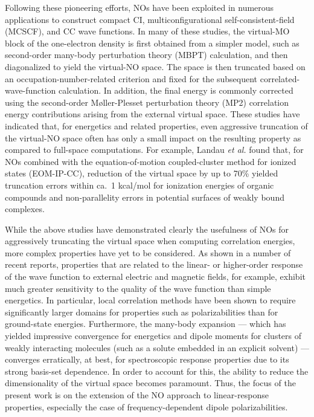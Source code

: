 Following these pioneering efforts, NOs have been exploited in numerous
applications to construct compact CI,\cite{Fermann94,Sherrill98:CI,Abrams04}
multiconfigurational self-consistent-field (MCSCF),\cite{Jensen88} and CC wave
functions.\cite{Sosa89,Taube05,Taube08,Landau10,DePrince13:FNOs,DePrince13} In
many of these studies, the virtual-MO block of the one-electron density is
first obtained from a simpler model, such as second-order many-body
perturbation theory (MBPT) calculation, and then diagonalized to yield the
virtual-NO space.  The space is then truncated based on an
occupation-number-related criterion and fixed for the subsequent
correlated-wave-function calculation.  In addition, the final energy is
commonly corrected using the second-order M\o ller-Plesset perturbation theory
(MP2) correlation energy contributions arising from the external virtual
space.  These studies have indicated that, for energetics and related
properties, even aggressive truncation of the virtual-NO space often has only
a small impact on the resulting property as compared to full-space
computations.  For example, Landau {\em et al.}\cite{Landau10} found that,
for NOs
combined with the equation-of-motion coupled-cluster method for ionized states
(EOM-IP-CC), reduction of the virtual space by up to 70\% yielded truncation
errors within ca.\ 1 kcal/mol for ionization energies of organic compounds and
non-parallelity errors in potential surfaces of weakly bound complexes.

While the above studies have demonstrated clearly the usefulness of NOs for
aggressively truncating the virtual space when computing correlation energies,
more complex properties have yet to be considered.  As shown in a number of
recent
reports,\cite{Korona04,Russ04,Russ08,McAlexander12,Friedrich15,McAlexander15:LRCC}
properties that are related to the linear- or higher-order response of the
wave function to external electric and magnetic fields, for example, exhibit
much greater sensitivity to the quality of the wave function than simple
energetics.  In particular, local correlation methods have been
shown\cite{Korona04,Russ04,Russ08,McAlexander12,McAlexander15:LRCC} to
require significantly larger domains for properties such as polarizabilities
than for ground-state energies.  Furthermore, the many-body expansion ---
which has yielded impressive convergence for energetics and dipole moments for
clusters of weakly interacting molecules (such as a solute embedded in an
explicit solvent) --- converges erratically, at best, for spectroscopic
response properties due to its strong basis-set dependence.\cite{Mach14}
In order to account for this, the ability to reduce the dimensionality
of the virtual space becomes paramount.  Thus, the focus of the present
work is on the extension of the NO approach to linear-response
properties, especially the case of frequency-dependent dipole
polarizabilities.

